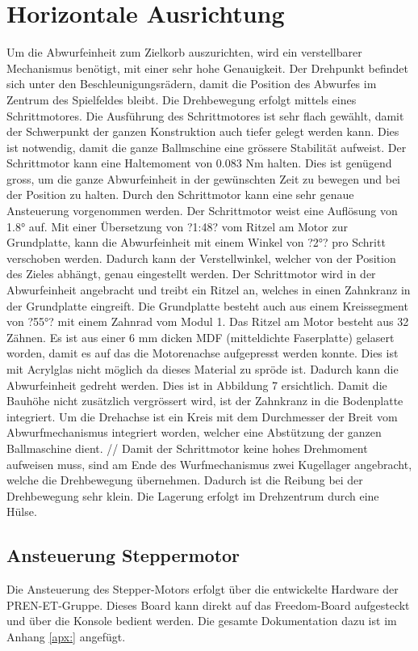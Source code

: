 \section{Horizontale Ausrichtung}

Um die Abwurfeinheit zum Zielkorb auszurichten, wird ein verstellbarer Mechanismus benötigt, mit einer sehr hohe Genauigkeit. Der Drehpunkt befindet sich unter den Beschleunigungsrädern, damit die Position des Abwurfes im Zentrum des Spielfeldes bleibt. Die Drehbewegung erfolgt mittels eines Schrittmotores. Die Ausführung des Schrittmotores ist sehr flach gewählt, damit der Schwerpunkt der ganzen Konstruktion auch tiefer gelegt werden kann. Dies ist notwendig, damit die ganze Ballmschine eine grössere Stabilität aufweist. Der Schrittmotor kann eine Haltemoment von 0.083 Nm halten. Dies ist genügend gross, um die ganze Abwurfeinheit in der gewünschten Zeit zu bewegen und bei der Position zu halten. Durch den Schrittmotor kann eine sehr genaue Ansteuerung vorgenommen werden. Der Schrittmotor weist eine Auflösung von 1.8° auf. Mit einer Übersetzung von ?1:48? vom Ritzel am Motor zur Grundplatte, kann die Abwurfeinheit mit einem Winkel von ?2°? pro Schritt verschoben werden. Dadurch kann der Verstellwinkel, welcher von der Position des Zieles abhängt, genau eingestellt werden. Der Schrittmotor wird in der Abwurfeinheit angebracht und treibt ein Ritzel an, welches in einen Zahnkranz in der Grundplatte eingreift. Die Grundplatte besteht auch aus einem Kreissegment von ?55°? mit einem Zahnrad vom Modul 1. Das Ritzel am Motor besteht aus 32 Zähnen. Es ist aus einer 6 mm dicken MDF (mitteldichte Faserplatte) gelasert worden, damit es auf das die Motorenachse aufgepresst werden konnte. Dies ist mit Acrylglas nicht möglich da dieses Material zu spröde ist. Dadurch kann die Abwurfeinheit gedreht werden. Dies ist in Abbildung 7 ersichtlich. Damit die Bauhöhe nicht zusätzlich vergrössert wird, ist der Zahnkranz in die Bodenplatte integriert. Um die Drehachse ist ein Kreis mit dem Durchmesser der Breit vom Abwurfmechanismus integriert worden, welcher eine Abstützung der ganzen Ballmaschine dient.  //
Damit der Schrittmotor keine hohes Drehmoment aufweisen muss, sind am Ende des Wurfmechanismus zwei Kugellager angebracht, welche die Drehbewegung übernehmen. Dadurch ist die Reibung bei der Drehbewegung sehr klein. Die Lagerung erfolgt im Drehzentrum durch eine Hülse.



 \subsection{Ansteuerung Steppermotor}

    Die Ansteuerung des Stepper-Motors erfolgt über die entwickelte Hardware der PREN-ET-Gruppe. Dieses Board kann direkt auf das Freedom-Board aufgesteckt und über die Konsole bedient werden. Die gesamte Dokumentation dazu ist im Anhang \ref{apx:} angefügt.
    
    
\newpage